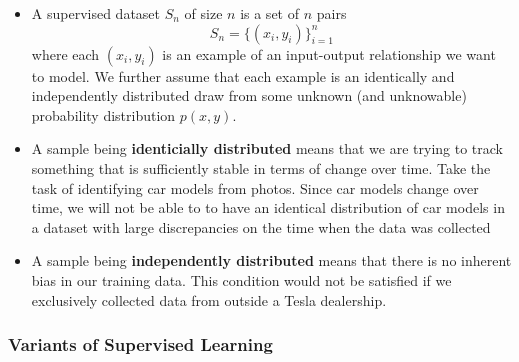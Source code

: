 \documentclass{article}
\newcommand{\tbf}[1]{\textbf{#1}}
\begin{document}
\begin{itemize}
    \item A supervised dataset $S_n$ of size $n$ is a set of $n$ pairs
    \[ S_n = \{(x_i, y_i)\}_{i=1}^n \]
    where each $(x_i, y_i)$ is an example of an input-output relationship we want to model. We further assume that each example is an identically and independently distributed
    draw from some unknown (and unknowable) probability distribution $p(x, y)$.
    \item A sample being \tbf{identicially distributed} means that we are trying to track something that is sufficiently stable in terms of change over time. 
    Take the task of identifying car models from photos.
    Since car models change over time, we will not be able to to have an identical distribution of car models in a dataset with large discrepancies on the time when the data was collected
    \item A sample being \tbf{independently distributed} means that there is no inherent bias in our training data. 
    This condition would not be satisfied if we exclusively collected data from outside a Tesla dealership. 
\end{itemize}

\subsubsection{Variants of Supervised Learning}
\end{document}
